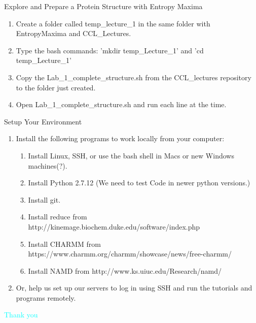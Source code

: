 \documentclass{beamer}
\begin{document}
\begin{frame}[shrink=15]{Explore and Prepare a Protein Structure with Entropy Maxima}
       \begin{enumerate}
             \item Create a folder called temp\_lecture\_1 in the same folder with EntropyMaxima and CCL\_Lectures. 
             \item Type the bash commands: 'mkdir temp\_Lecture\_1' and 'cd temp\_Lecture\_1'
             \item Copy the Lab\_1\_complete\_structure.sh from the CCL\_lectures repository to the folder just created.
             \item Open Lab\_1\_complete\_structure.sh and run each line at the time.
       \end{enumerate}
\end{frame}
\begin{frame}[shrink=15]{Setup Your Environment}
       \begin{enumerate}
             \item Install the following programs to work locally from your computer:
             \begin{enumerate}
                   \item Install Linux, SSH, or use the bash shell in Macs or new Windows machines(?).
                   \item Install Python 2.7.12 (We need to test Code in newer python versions.)
                   \item Install git.
                   \item Install reduce from http://kinemage.biochem.duke.edu/software/index.php
                   \item Install CHARMM from https://www.charmm.org/charmm/showcase/news/free-charmm/
                   \item Install NAMD from http://www.ks.uiuc.edu/Research/namd/
             \end{enumerate}
             \item Or, help us set up our servers to log in using SSH and run the tutorials and programs remotely.
       \end{enumerate}
\end{frame}
\begin{frame}{}
   \begin{center}
   \textcolor{cyan}{\large Thank you}
   \end{center}
\end{frame}
\end{document}
